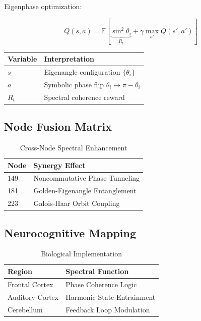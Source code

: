 \documentclass[12pt]{article}
\begin{document}
\begin{center}
Eigenphase optimization:

\[
Q(s,a) = \mathbb{E}\left[\underbrace{\sin^2\theta_i}_{R_t} + \gamma \max_{a'} Q(s',a')\right]
\]

\begin{table}[h]
\centering
\begin{tabular}{ll}
\hline
\textbf{Variable} & \textbf{Interpretation} \\
\hline
$s$ & Eigenangle configuration $\{\theta_i\}$ \\
$a$ & Symbolic phase flip $\theta_i \mapsto \pi - \theta_i$ \\
$R_t$ & Spectral coherence reward \\
\hline
\end{tabular}
\end{table}

\subsection{Node Fusion Matrix}
\label{subsec:fusion}

\begin{table}[h]
\centering
\caption{Cross-Node Spectral Enhancement}
\begin{tabular}{ll}
\hline
\textbf{Node} & \textbf{Synergy Effect} \\
\hline
149 & Noncommutative Phase Tunneling \\
181 & Golden-Eigenangle Entanglement \\
223 & Galois-Haar Orbit Coupling \\
\hline
\end{tabular}
\end{table}

\subsection{Neurocognitive Mapping}
\label{subsec:neuro}

\begin{table}[h]
\centering
\caption{Biological Implementation}
\begin{tabular}{ll}
\hline
\textbf{Region} & \textbf{Spectral Function} \\
\hline
Frontal Cortex & Phase Coherence Logic \\
Auditory Cortex & Harmonic State Entrainment \\
Cerebellum & Feedback Loop Modulation \\
\hline
\end{tabular}
\end{table}


\end{center}
\end{document}
